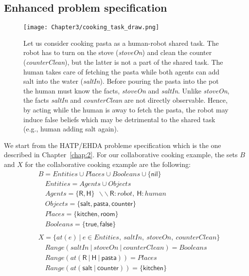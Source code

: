     \subsection{Enhanced problem specification}

\begin{figure}
    \centering
    \texttt{[image: Chapter3/cooking\_task\_draw.png]}
    \caption{
    Let us consider cooking pasta as a human-robot shared task. 
    The robot has to turn on the stove (\textit{stoveOn}) and clean the counter (\textit{counterClean}), but the latter is not a part of the shared task. The human takes care of fetching the pasta while both agents can add salt into the water (\textit{saltIn}). Before pouring the pasta into the pot the human must know the facts, \textit{stoveOn} and \textit{saltIn}. 
    Unlike \textit{stoveOn}, the facts \textit{saltIn} and \textit{counterClean} are not directly observable. 
    Hence, by acting while the human is away to fetch the pasta, the robot may induce false beliefs which may be detrimental to the shared task (e.g., human adding salt again).
    }
    \label{fig:new_scene}
\end{figure}

We start from the HATP/EHDA probleme specification which is the one described in Chapter~\ref{chap:2}. For our collaborative cooking example, the sets $B$ and $X$ for the collaborative cooking example are the following:
{\small
\begin{align*}
&B           = Entities \cup Places \cup Booleans \cup \{\textsf{nil}\} \\
&\quad Entities    = Agents \cup Objects\\
&\quad Agents      = \{ \textsf{R}, \textsf{H} \} ~~ \backslash\backslash~\textsf{R}:robot,~\textsf{H}:human\\
&\quad Objects     = \{ \textsf{salt}, \textsf{pasta}, \textsf{counter} \}\\
&\quad Places      = \{ \textsf{kitchen}, \textsf{room} \}\\
&\quad Booleans    = \{ \textsf{true},\textsf{false} \}\\
&\\
&X = \{ at(e)~|~ e \in Entities, ~saltIn, ~stoveOn, ~counterClean  \}\\
&\quad \textit{Range}(saltIn ~|~ stoveOn ~|~ counterClean)=Booleans\\
&\quad \textit{Range}(at(\textsf{R} ~|~ \textsf{H} ~|~ \textsf{pasta})) = Places\\
&\quad \textit{Range}(at(\textsf{salt} ~|~ \textsf{counter})) = \{ \textsf{kitchen} \}
\end{align*}
}

